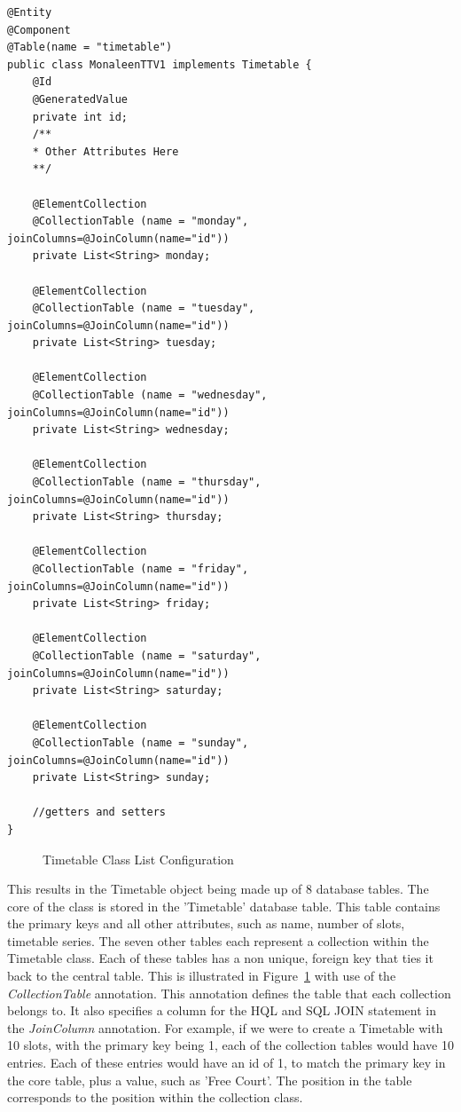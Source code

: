 \begin{lstlisting}
@Entity
@Component
@Table(name = "timetable")
public class MonaleenTTV1 implements Timetable {
	@Id
	@GeneratedValue
	private int id;
	/**
	* Other Attributes Here
	**/
	
	@ElementCollection
	@CollectionTable (name = "monday", joinColumns=@JoinColumn(name="id"))
	private List<String> monday;
	
	@ElementCollection
	@CollectionTable (name = "tuesday", joinColumns=@JoinColumn(name="id"))
	private List<String> tuesday;
	
	@ElementCollection
	@CollectionTable (name = "wednesday", joinColumns=@JoinColumn(name="id"))
	private List<String> wednesday;
	
	@ElementCollection
	@CollectionTable (name = "thursday", joinColumns=@JoinColumn(name="id"))
	private List<String> thursday;
	
	@ElementCollection
	@CollectionTable (name = "friday", joinColumns=@JoinColumn(name="id"))
	private List<String> friday;
	
	@ElementCollection
	@CollectionTable (name = "saturday", joinColumns=@JoinColumn(name="id"))
	private List<String> saturday;
	
	@ElementCollection
	@CollectionTable (name = "sunday", joinColumns=@JoinColumn(name="id"))
	private List<String> sunday;
	
	//getters and setters
}
\end{lstlisting}
\begin{figure}[H]
\caption{Timetable Class List Configuration}
\label{fig:timetableConfig}
\end{figure}

This results in the Timetable object being made up of 8 database tables. The core of the class is stored in the 'Timetable' database table. This table contains the primary keys and all other attributes, such as name, number of slots, timetable series. The seven other tables each represent a collection within the Timetable class. Each of these tables has a non unique, foreign key that ties it back to the central table. This is illustrated in Figure~\ref{fig:timetableConfig} with use of the \textit{CollectionTable} annotation. This annotation defines the table that each collection belongs to. It also specifies a column for the HQL and SQL JOIN statement in the \textit{JoinColumn} annotation. For example, if we were to create a Timetable with 10 slots, with the primary key being 1, each of the collection tables would have 10 entries. Each of these entries would have an id of 1, to match the primary key in the core table, plus a value, such as 'Free Court'. The position in the table corresponds to the position within the collection class. 

